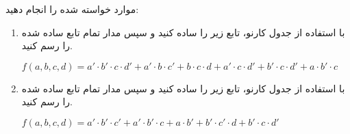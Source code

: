  موارد خواسته شده را انجام دهید:
 
 
 \begin{enumerate}
 	\item 
 	با استفاده از جدول کارنو، تابع زیر را ساده کنید و سپس مدار تمام  تابع ساده شده را رسم کنید.
 	\begin{latin}
	 	$f (a,b,c,d) = a'\cdot b'\cdot c\cdot d' + a' \cdot b \cdot c' + b \cdot c \cdot d + a' \cdot c \cdot d' + b' \cdot c \cdot d' + a \cdot b' \cdot c$
 	\end{latin}
 	
 	
 	\item 
 	با استفاده از جدول کارنو، تابع زیر را ساده کنید و سپس مدار تمام  تابع ساده شده را رسم کنید.
 	
 	\begin{latin}
 		$f (a,b,c,d) = a' \cdot b' \cdot c' + a' \cdot b' \cdot c + a \cdot b' + b' \cdot c' \cdot d + b' \cdot c \cdot d'$ 
 	\end{latin}
 	
 	
 \end{enumerate}